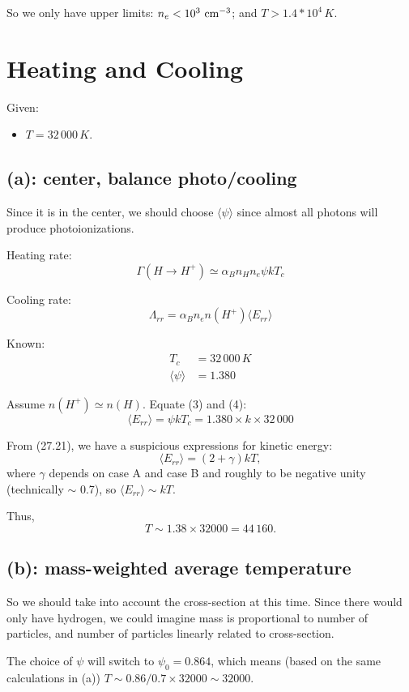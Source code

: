 \documentclass[12pt,letterpaper]{article}
\newcommand{\cm}{\textrm{\,cm}}
\begin{document}
So we only have upper limits:
$ n_e < 10^3 \,\cm^{-3}$; and $ T > 1.4*10^4 \, K $.

\section*{Heating and Cooling}

Given:
\begin{itemize}
    \item $T = 32\,000\,K$.
\end{itemize}

\subsection*{(a): center, balance photo/cooling}

Since it is in the center, we should choose $\langle\psi\rangle$ since almost all photons will produce photoionizations.

Heating rate:
\begin{equation}
    \Gamma(H \rightarrow H^+)
    \simeq \alpha_B n_H n_e \psi k T_c
\end{equation}

Cooling rate:
\begin{equation}
    \Lambda_{rr} = \alpha_B n_e n(H^+) \langle E_{rr} \rangle
\end{equation}

Known:
\begin{equation}
    \begin{split}
        T_c &= 32\,000 \, K\\
        \langle \psi \rangle &= 1.380
    \end{split}
\end{equation}

Assume $n(H^+) \simeq n(H)$.
Equate (3) and (4):
\begin{equation*}
    \langle E_{rr} \rangle = \psi k T_c = 1.380 \times k \times 32\,000
\end{equation*}

From (27.21), we have a suspicious expressions for kinetic energy:
\begin{equation}
    \langle E_{rr} \rangle
    = (2 + \gamma) k T,
\end{equation}
where $\gamma$ depends on case A and case B and roughly to be negative unity (technically $\sim$ 0.7), so $ \langle E_{rr} \rangle \sim kT$.

Thus, 
\begin{equation*}
    T \sim 1.38 \times 32000 = 44\,160.    
\end{equation*}

\subsection*{(b): mass-weighted average temperature}
So we should take into account the cross-section at this time.
Since there would only have hydrogen, we could imagine mass is proportional to number of particles, and number of particles linearly related to cross-section.

The choice of $\psi$ will switch to $\psi_0 = 0.864$, which means (based on the same calculations in (a)) $T \sim 0.86 / 0.7 \times 32000 \sim 32000 $.
\end{document}

